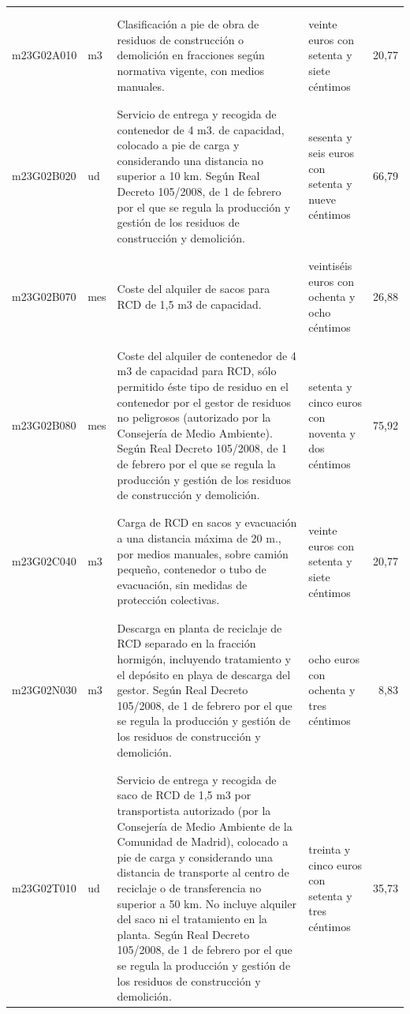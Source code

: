 \begin{supertabular}{|l|l|p{5cm}|p{3cm}|r|}
&&&&\\%
&&&&\\%
m23G02A010&m3&Clasificación a pie de obra de residuos de construcción o demolición en fracciones según normativa vigente, con medios manuales.&veinte euros con setenta y siete céntimos&20,77\\%
&&&&\\%
&&&&\\%
m23G02B020&ud&Servicio de entrega y recogida de contenedor de 4 m3. de capacidad, colocado a pie de carga y considerando una distancia no superior a 10 km. Según Real Decreto 105/2008, de 1 de febrero por el que se regula la producción y gestión de los residuos de construcción y demolición.&sesenta y seis euros con setenta y nueve céntimos&66,79\\%
&&&&\\%
&&&&\\%
m23G02B070&mes&Coste del alquiler de sacos para RCD de 1,5 m3 de capacidad.&veintiséis euros con ochenta y ocho céntimos&26,88\\%
&&&&\\%
&&&&\\%
m23G02B080&mes&Coste del alquiler de contenedor de 4 m3 de capacidad para RCD, sólo permitido éste tipo de residuo en el contenedor por el gestor de residuos no peligrosos (autorizado por la Consejería de Medio Ambiente). Según Real Decreto 105/2008, de 1 de febrero por el que se regula la producción y gestión de los residuos de construcción y demolición.&setenta y cinco euros con noventa y dos céntimos&75,92\\%
&&&&\\%
&&&&\\%
m23G02C040&m3&Carga de RCD en sacos y evacuación a una distancia máxima de 20 m., por medios manuales, sobre camión pequeño, contenedor o tubo de evacuación, sin medidas de protección colectivas.&veinte euros con setenta y siete céntimos&20,77\\%
&&&&\\%
&&&&\\%
m23G02N030&m3&Descarga en planta de reciclaje de RCD separado en la fracción hormigón, incluyendo tratamiento y el depósito en playa de descarga del gestor. Según Real Decreto 105/2008, de 1 de febrero por el que se regula la producción y gestión de los residuos de construcción y demolición.&ocho euros con ochenta y tres céntimos&8,83\\%
&&&&\\%
&&&&\\%
m23G02T010&ud&Servicio de entrega y recogida de saco de RCD de 1,5 m3 por transportista autorizado (por la Consejería de Medio Ambiente de la Comunidad de Madrid), colocado a pie de carga y considerando una distancia de transporte al centro de reciclaje o de transferencia no superior a 50 km. No incluye alquiler del saco ni el tratamiento en la planta. Según Real Decreto 105/2008, de 1 de febrero por el que se regula la producción y gestión de los residuos de construcción y demolición.&treinta y cinco euros con setenta y tres céntimos&35,73\\%

\end{supertabular}
